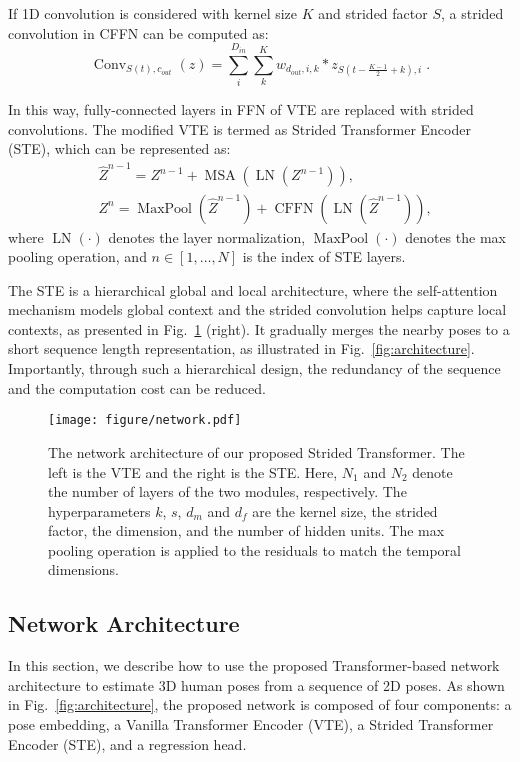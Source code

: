 \documentclass[journal]{IEEEtran}
\begin{document}
If 1D convolution is considered with kernel size $K$ and strided factor $S$, a strided convolution in CFFN can be computed as:
\begin{equation}
   \operatorname {Conv}_{S(t), c_{out}}(z)=\sum_{i}^{D_{i n}} \sum_{k}^{K} w_{d_{out}, i, k} * z_{S(t-\frac{K-1}{2}+k), i} \; . 
\end{equation}

In this way, fully-connected layers in FFN of VTE are replaced with strided convolutions. 
The modified VTE is termed as Strided Transformer Encoder (STE), which can be represented as:
\begin{align}
   \label{equ:ste_1}
   & \hat{Z}^{n-1}=Z^{n-1}+\operatorname{MSA}(\operatorname{LN}(Z^{n-1})), \\
   & Z^{n}=\operatorname{MaxPool}(\hat{Z}^{n-1})+\operatorname{CFFN}(\operatorname{LN}(\hat{Z}^{n-1})),
   \label{equ:ste_2}
\end{align}
where $\operatorname{LN}(\cdot)$ denotes the layer normalization, $\operatorname{MaxPool}(\cdot)$ denotes the max pooling operation, and $n \in[1, \ldots, N]$ is the index of STE layers. 

The STE is a hierarchical global and local architecture, where the self-attention mechanism models global context and the strided convolution helps capture local contexts, as presented in Fig.~\ref{fig:network} (right). 
It gradually merges the nearby poses to a short sequence length representation, as illustrated in Fig.~\ref{fig:architecture}. 
Importantly, through such a hierarchical design, the redundancy of the sequence and the computation cost can be reduced. 

\begin{figure}[t]
   \centering
   \texttt{[image: figure/network.pdf]}
   \caption
   {
      The network architecture of our proposed Strided Transformer. 
      The left is the VTE and the right is the STE. 
      Here, $N_{1}$ and $N_{2}$ denote the number of layers of the two modules, respectively. 
      The hyperparameters $k$, $s$, $d_{m}$ and $d_{f}$ are the kernel size, the strided factor, the dimension, and the number of hidden units. 
      The max pooling operation is applied to the residuals to match the temporal dimensions. 
   }
   \label{fig:network}
\end{figure}

\subsection{Network Architecture}
\label{sec:transpose}
In this section, we describe how to use the proposed Transformer-based network architecture to estimate 3D human poses from a sequence of 2D poses. 
As shown in Fig.~\ref{fig:architecture}, the proposed network is composed of four components: a pose embedding, a Vanilla Transformer Encoder (VTE), a Strided Transformer Encoder (STE), and a regression head. 
\end{document}

